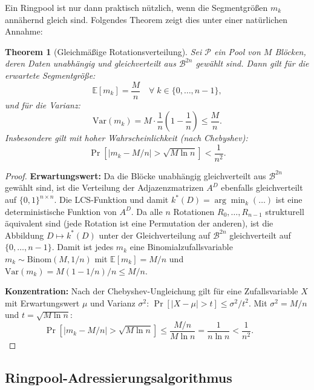 ﻿\documentclass[a4paper,12pt]{article}
\theoremstyle{definition}
\theoremstyle{plain}
\newtheorem{theorem}{Theorem}[section]
\begin{document}
Ein Ringpool ist nur dann praktisch nützlich, wenn die Segmentgrößen
$m_k$ annähernd gleich sind.  Folgendes Theorem zeigt dies unter einer
natürlichen Annahme:

\begin{theorem}[Gleichmäßige Rotationsverteilung]
\label{thm:gleichmaessig}
  Sei $\mathcal{P}$ ein Pool von $M$ Blöcken, deren Daten unabhängig
  und gleichverteilt aus $\mathcal{B}^{2n}$ gewählt sind.
  Dann gilt für die erwartete Segmentgröße:
  \[
    \mathbb{E}[m_k] = \frac{M}{n}
    \quad \forall\; k \in \{0, \ldots, n-1\},
  \]
  und für die Varianz:
  \[
    \mathrm{Var}(m_k) = M \cdot \frac{1}{n}\left(1 - \frac{1}{n}\right)
    \le \frac{M}{n}.
  \]
  Insbesondere gilt mit hoher Wahrscheinlichkeit (nach Chebyshev):
  \[
    \Pr\!\left[|m_k - M/n| > \sqrt{M \ln n}\right]
    < \frac{1}{n^2}.
  \]
\end{theorem}

\begin{proof}
  \textbf{Erwartungswert:} Da die Blöcke unabhängig gleichverteilt aus
  $\mathcal{B}^{2n}$ gewählt sind, ist die Verteilung der Adjazenzmatrizen
  $A^D$ ebenfalls gleichverteilt auf $\{0,1\}^{n \times n}$.  Die LCS-Funktion
  und damit $k^*(D) = \arg\min_k(\ldots)$ ist eine deterministische
  Funktion von $A^D$.  Da alle $n$ Rotationen $R_0, \ldots, R_{n-1}$
  strukturell äquivalent sind (jede Rotation ist eine Permutation der
  anderen), ist die Abbildung $D \mapsto k^*(D)$ unter der Gleichverteilung
  auf $\mathcal{B}^{2n}$ gleichverteilt auf $\{0, \ldots, n-1\}$.
  Damit ist jedes $m_k$ eine Binomialzufallsvariable
  $m_k \sim \mathrm{Binom}(M, 1/n)$ mit
  $\mathbb{E}[m_k] = M/n$ und $\mathrm{Var}(m_k) = M(1-1/n)/n \le M/n$.

  \textbf{Konzentration:} Nach der Chebyshev-Ungleichung gilt für eine
  Zufallsvariable $X$ mit Erwartungswert $\mu$ und Varianz $\sigma^2$:
  $\Pr[|X - \mu| > t] \le \sigma^2/t^2$.
  Mit $\sigma^2 = M/n$ und $t = \sqrt{M \ln n}$:
  \[
    \Pr\!\left[|m_k - M/n| > \sqrt{M \ln n}\right]
    \le \frac{M/n}{M \ln n} = \frac{1}{n \ln n} < \frac{1}{n^2}. \qquad 
  \]
\end{proof}

\subsection{Ringpool-Adressierungsalgorithmus}
\label{ssec:ringpool_algo}
\end{document}
